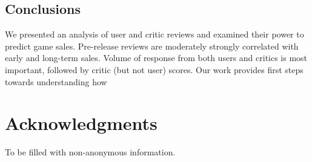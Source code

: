 \documentclass[letterpaper]{article}
\begin{document}
\subsection{Conclusions}
We presented an analysis of user and critic reviews and examined their power to predict game sales. Pre-release reviews are moderately strongly correlated with early and long-term sales. Volume of response from both users and critics is most important, followed by critic (but not user) scores. Our work provides first steps towards understanding how 

\section{Acknowledgments}
To be filled with non-anonymous information.



\end{document}

